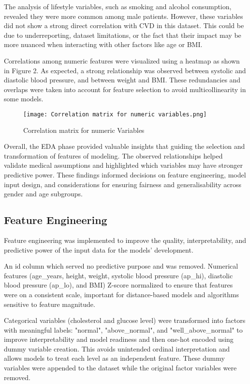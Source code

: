 \documentclass[conference]{IEEEtran}
\begin{document}
The analysis of lifestyle variables, such as smoking and alcohol consumption, revealed they were more common among male patients. However, these variables did not show a strong direct correlation with CVD in this dataset. This could be due to underreporting, dataset limitations, or the fact that their impact may be more nuanced when interacting with other factors like age or BMI. %

Correlations among numeric features were visualized using a heatmap as shown in Figure 2. As expected, a strong relationship was observed between systolic and diastolic blood pressure, and between weight and BMI. These redundancies and overlaps were taken into account for feature selection to avoid multicollinearity in some models. 

\begin{figure}[htbp]
\centerline{\texttt{[image: Correlation matrix for numeric variables.png]}}
\caption{Correlation matrix for numeric Variables}
\label{fig}
\end{figure}

Overall, the EDA phase provided valuable insights that guiding the selection and transformation of features of modeling. The observed relationships helped validate medical assumptions and highlighted which variables may have stronger predictive power. These findings informed decisions on feature engineering, model input design, and considerations for ensuring fairness and generalisability across gender and age subgroups. 

\subsection{Feature Engineering} 

Feature engineering was implemented to improve the quality, interpretability, and predictive power of the input data for the models' development.

An id column which served no predictive purpose and was removed. Numerical features (age\_years, height, weight, systolic blood pressure (ap\_hi), diastolic blood pressure (ap\_lo), and BMI) Z-score normalized to ensure that features were on a consistent scale, important for distance-based models and algorithms sensitive to feature magnitude.

Categorical variables (cholesterol and glucose level)  were transformed into factors with meaningful labels: "normal", "above\_normal", and "well\_above\_normal" to improve interpretability and model readiness and then one-hot encoded using dummy variable creation. This avoids unintended ordinal interpretation and allows models to treat each level as an independent feature. These dummy variables were appended to the dataset while the original factor variables were removed. 
\end{document}
